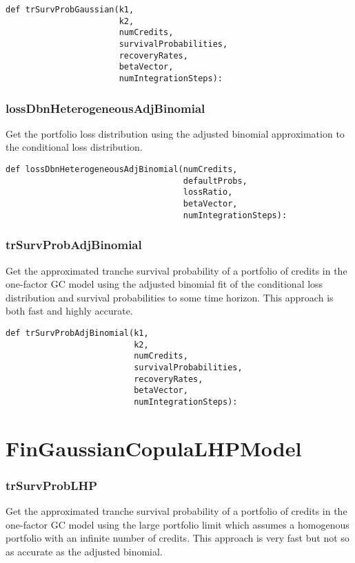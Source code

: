 \documentclass[twoside,11pt]{book}
\begin{document}
\begin{lstlisting}
def trSurvProbGaussian(k1,
                       k2,
                       numCredits,
                       survivalProbabilities,
                       recoveryRates,
                       betaVector,
                       numIntegrationSteps):
\end{lstlisting}

\subsubsection*{{\bf lossDbnHeterogeneousAdjBinomial}}
Get the portfolio loss distribution using the adjusted binomial approximation to the conditional loss distribution.  

\begin{lstlisting}
def lossDbnHeterogeneousAdjBinomial(numCredits,
                                    defaultProbs,
                                    lossRatio,
                                    betaVector,
                                    numIntegrationSteps):
\end{lstlisting}

\subsubsection*{{\bf trSurvProbAdjBinomial}}
Get the approximated tranche survival probability of a portfolio of credits in the one-factor GC model using the adjusted binomial fit of the conditional loss distribution and survival probabilities to some time horizon. This approach is both fast and highly accurate.  

\begin{lstlisting}
def trSurvProbAdjBinomial(k1,
                          k2,
                          numCredits,
                          survivalProbabilities,
                          recoveryRates,
                          betaVector,
                          numIntegrationSteps):
\end{lstlisting}

\newpage
\section{FinGaussianCopulaLHPModel}

\subsubsection*{{\bf trSurvProbLHP}}
Get the approximated tranche survival probability of a portfolio of credits in the one-factor GC model using the large portfolio limit which assumes a homogenous portfolio with an infinite number of credits. This approach is very fast but not so as accurate as the adjusted binomial.  
\end{document}
